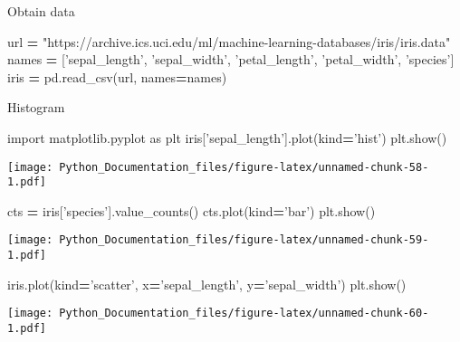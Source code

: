 \documentclass[]{book}
\newenvironment{Shaded}{\begin{snugshade}}{\end{snugshade}}
\newcommand{\ImportTok}[1]{#1}
\newcommand{\NormalTok}[1]{#1}
\newcommand{\OperatorTok}[1]{\textcolor[rgb]{0.81,0.36,0.00}{\textbf{#1}}}
\newcommand{\StringTok}[1]{\textcolor[rgb]{0.31,0.60,0.02}{#1}}
\theoremstyle{definition}
\theoremstyle{definition}
\theoremstyle{definition}
\theoremstyle{remark}
\begin{document}
Obtain data

\begin{Shaded}
\begin{Highlighting}[]
\NormalTok{url }\OperatorTok{=} \StringTok{"https://archive.ics.uci.edu/ml/machine-learning-databases/iris/iris.data"}
\NormalTok{names }\OperatorTok{=}\NormalTok{ [}\StringTok{'sepal_length'}\NormalTok{, }\StringTok{'sepal_width'}\NormalTok{, }\StringTok{'petal_length'}\NormalTok{, }\StringTok{'petal_width'}\NormalTok{, }\StringTok{'species'}\NormalTok{]}
\NormalTok{iris }\OperatorTok{=}\NormalTok{ pd.read_csv(url, names}\OperatorTok{=}\NormalTok{names)}
\end{Highlighting}
\end{Shaded}

Histogram

\begin{Shaded}
\begin{Highlighting}[]
\ImportTok{import}\NormalTok{ matplotlib.pyplot }\ImportTok{as}\NormalTok{ plt}
\NormalTok{iris[}\StringTok{'sepal_length'}\NormalTok{].plot(kind}\OperatorTok{=}\StringTok{'hist'}\NormalTok{)}
\NormalTok{plt.show()}
\end{Highlighting}
\end{Shaded}

\texttt{[image: Python\_Documentation\_files/figure-latex/unnamed-chunk-58-1.pdf]}

\begin{Shaded}
\begin{Highlighting}[]
\NormalTok{cts }\OperatorTok{=}\NormalTok{ iris[}\StringTok{'species'}\NormalTok{].value_counts()}
\NormalTok{cts.plot(kind}\OperatorTok{=}\StringTok{'bar'}\NormalTok{)}
\NormalTok{plt.show()}
\end{Highlighting}
\end{Shaded}

\texttt{[image: Python\_Documentation\_files/figure-latex/unnamed-chunk-59-1.pdf]}

\begin{Shaded}
\begin{Highlighting}[]
\NormalTok{iris.plot(kind}\OperatorTok{=}\StringTok{'scatter'}\NormalTok{, x}\OperatorTok{=}\StringTok{'sepal_length'}\NormalTok{, y}\OperatorTok{=}\StringTok{'sepal_width'}\NormalTok{)}
\NormalTok{plt.show()}
\end{Highlighting}
\end{Shaded}

\texttt{[image: Python\_Documentation\_files/figure-latex/unnamed-chunk-60-1.pdf]}
\end{document}
